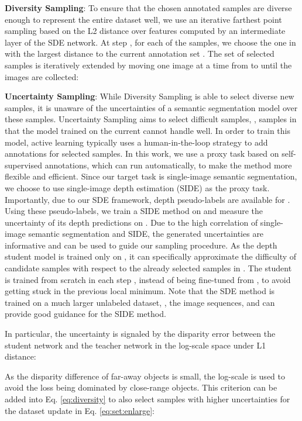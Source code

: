 \documentclass[final]{cvpr}
\begin{document}
\noindent\textbf{Diversity Sampling}:
To ensure that the chosen annotated samples are diverse enough to represent the entire dataset well, we use an iterative farthest point sampling based on the L2 distance over features  computed by an intermediate layer of the SDE network.
At step , for each of the  samples, we choose the one in  with the largest distance to the current annotation set .
The set of selected samples  is iteratively extended by moving one image at a time from  to  until the  images are collected:




\noindent\textbf{Uncertainty Sampling}:
While Diversity Sampling is able to select diverse new samples, it is unaware of the uncertainties of a semantic segmentation model over these samples. Uncertainty Sampling aims to select difficult samples, \ie, samples in  that the model trained on the current  cannot handle well.
In order to train this model, active learning typically uses a human-in-the-loop strategy to add annotations for selected samples. In this work, we use a proxy task based on self-supervised annotations, which can run automatically, to make the method more flexible and efficient.
Since our target task is single-image semantic segmentation, we choose to use single-image depth estimation (SIDE) as the proxy task. Importantly, due to our SDE framework, depth pseudo-labels are available for . Using these pseudo-labels, we train a SIDE method on  and measure the uncertainty of its depth predictions on . Due to the high correlation of single-image semantic segmentation and SIDE, the generated uncertainties are informative and can be used to guide our sampling procedure. As the depth student model is trained only on , it can specifically approximate the difficulty of candidate samples with respect to the already selected samples in . The student is trained from scratch in each step , instead of being fine-tuned from , to avoid getting stuck in the previous local minimum. Note that the SDE method is trained on a much larger unlabeled dataset, \ie, the  image sequences, and can provide good guidance for the SIDE method.

In particular, the uncertainty is signaled by the disparity error between the student network  and the teacher network  in the log-scale space under L1 distance: 

As the disparity difference of far-away objects is small, the log-scale is used to avoid the loss being dominated by close-range objects. This criterion can be added into Eq. \ref{eq:diversity} to also select samples with higher uncertainties for the dataset update in Eq. \ref{eq:set:enlarge}: 
\end{document}
